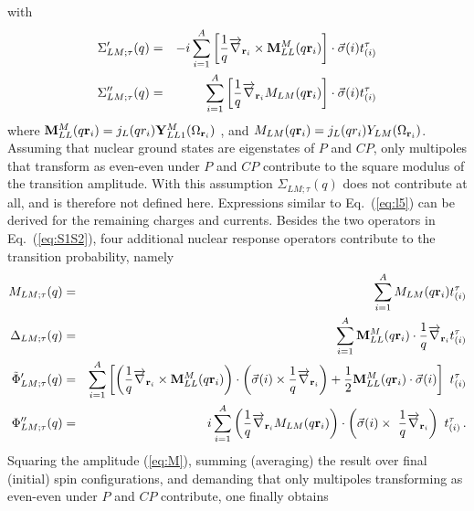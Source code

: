 \documentclass[11pt,a4paper]{article}
\begin{document}
with 
\begin{eqnarray}
\Sigma'_{LM;\tau}(q) &=& -i \sum_{i=1}^{A} \left[ \frac{1}{q} \overrightarrow{\nabla}_{{\bf{r}}_i} \times {\bf{M}}_{LL}^{M}(q {\bf{r}}_i)  \right] \cdot \vec{\sigma}(i) t^{\tau}_{(i)}\nonumber\\
\Sigma''_{LM;\tau}(q) &=&\sum_{i=1}^{A} \left[ \frac{1}{q} \overrightarrow{\nabla}_{{\bf{r}}_i} M_{LM}(q {\bf{r}}_i)  \right] \cdot \vec{\sigma}(i) t^{\tau}_{(i)}
\label{eq:S1S2}
\end{eqnarray}
where ${\bf{M}}_{LL}^{M}(q {\bf{r}}_i)=j_{L}(q r_i){\bf Y}^M_{LL1}(\Omega_{{\bf{r}}_i})$ , and $M_{LM}(q {\bf{r}}_i)=j_{L}(q r_i)Y_{LM}(\Omega_{{\bf{r}}_i})$. Assuming that nuclear ground states are eigenstates of $P$ and $CP$, only multipoles that transform as even-even under $P$ and $CP$ contribute to the square modulus of the transition amplitude. With this assumption 
$\Sigma_{LM;\tau}(q)$ does not contribute at all, and is therefore not defined here. Expressions similar to Eq.~(\ref{eq:l5}) can be derived for the remaining charges and currents. 
Besides the two operators in Eq.~(\ref{eq:S1S2}), four additional nuclear response operators contribute to the transition probability, namely 
\begin{eqnarray}
M_{LM;\tau}(q) &=& \sum_{i=1}^{A} M_{LM}(q {\bf{r}}_i) t^{\tau}_{(i)}\nonumber\\
\Delta_{LM;\tau}(q) &=&\sum_{i=1}^{A}  {\bf{M}}_{LL}^{M}(q {\bf{r}}_i) \cdot \frac{1}{q}\overrightarrow{\nabla}_{{\bf{r}}_i} t^{\tau}_{(i)} \nonumber\\
\tilde{\Phi}^{\prime}_{LM;\tau}(q) &=& \sum_{i=1}^A \left[ \left( {1 \over q} \overrightarrow{\nabla}_{{\bf{r}}_i} \times {\bf{M}}_{LL}^M(q {\bf{r}}_i) \right) \cdot \left(\vec{\sigma}(i) \times {1 \over q} \overrightarrow{\nabla}_{{\bf{r}}_i} \right) + {1 \over 2} {\bf{M}}_{LL}^M(q {\bf{r}}_i) \cdot \vec{\sigma}(i) \right]~t^\tau_{(i)} \nonumber \\
\Phi^{\prime \prime}_{LM;\tau}(q ) &=& i  \sum_{i=1}^A\left( {1 \over q} \overrightarrow{\nabla}_{{\bf{r}}_i}  M_{LM}(q {\bf{r}}_i) \right) \cdot \left(\vec{\sigma}(i) \times \
{1 \over q} \overrightarrow{\nabla}_{{\bf{r}}_i}  \right)~t^\tau_{(i)} \,.
\label{eq:MDP}
\end{eqnarray}
Squaring the amplitude (\ref{eq:M}), summing (averaging) the result over final (initial) spin configurations, and demanding that only multipoles transforming as even-even under $P$ and $CP$ contribute, one finally obtains~\cite{Fitzpatrick:2012ix} 
\end{document}
